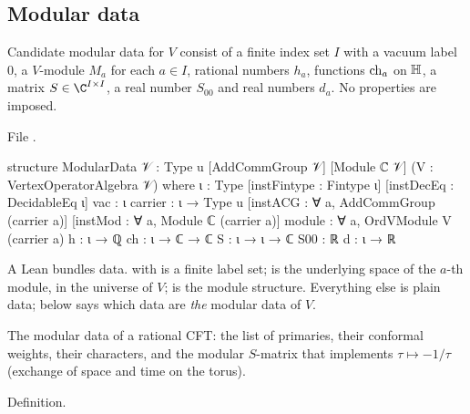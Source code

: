 \subsection{Modular data}

\begin{definition}\label{l22:def:moddata}
Candidate modular data for $V$ consist of a finite index set $I$ with a vacuum label $0$, a $V$-module $M_a$ for
each $a\in I$, rational numbers $h_a$, functions $\operatorname{ch}_a$ on $\mathbb{H}$, a matrix $S\in\C^{I\times I}$, a real
number $S_{00}$ and real numbers $d_a$. No properties are imposed.
\end{definition}
\noindent File .
\begin{leancode}
structure ModularData {𝒱 : Type u} [AddCommGroup 𝒱] [Module ℂ 𝒱]
    (V : VertexOperatorAlgebra 𝒱) where
  ι : Type
  [instFintype : Fintype ι]
  [instDecEq : DecidableEq ι]
  vac : ι
  carrier : ι → Type u
  [instACG : ∀ a, AddCommGroup (carrier a)]
  [instMod : ∀ a, Module ℂ (carrier a)]
  module : ∀ a, OrdVModule V (carrier a)
  h : ι → ℚ
  ch : ι → ℂ → ℂ
  S : ι → ι → ℂ
  S00 : ℝ
  d : ι → ℝ
\end{leancode}

\begin{dictionary}
A Lean  bundles data.  with \lean{[Fintype ι] [DecidableEq ι]} is a finite
label set;  is the underlying space of the $a$-th module, in the universe of $V$;
 is the module structure. Everything else is plain data;
 below says which data are \emph{the} modular data of $V$.
\end{dictionary}

\begin{physics}
The modular data of a rational CFT: the list of primaries, their conformal weights, their characters, and
the modular $S$-matrix that implements $\tau\mapsto-1/\tau$ (exchange of space and time on the torus).
\end{physics}

\begin{status}
Definition.
\end{status}

